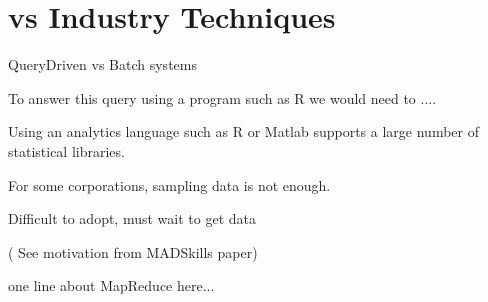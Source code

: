 
\section{{\system } vs Industry Techniques}

QueryDriven vs Batch systems

To answer this query using a program such as R we would need to ....

Using an analytics language such as R or Matlab supports a large number of 
statistical libraries.

For some corporations, sampling data is not enough.

Difficult to adopt, must wait to get data 

( See motivation from MADSkills paper)

one line about MapReduce here...
